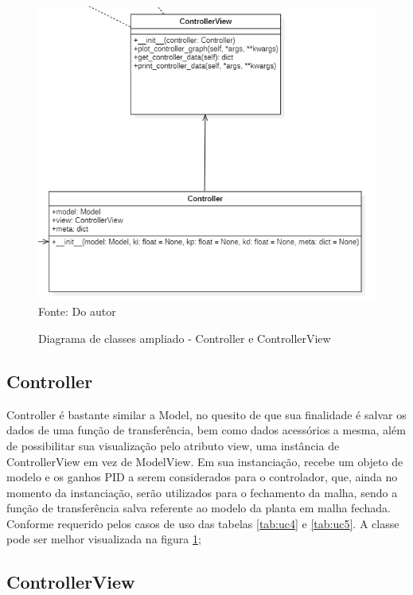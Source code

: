 \begin{figure}[H]
    \centering
    \caption{Diagrama de classes ampliado - Controller e ControllerView}
    \includegraphics[scale=0.7]{figuras/class_diag_controller}
    \label{fig:class_diag_controller}
    \\
    \vspace{0cm}\hspace{0cm}\small{Fonte: Do autor}
\end{figure}

\subsection{Controller}

Controller é bastante similar a Model, no quesito de que sua finalidade é salvar os dados de uma função de
transferência, bem como dados acessórios a mesma, além de possibilitar sua visualização pelo atributo view, uma
instância de ControllerView em vez de ModelView.
Em sua instanciação, recebe um objeto de modelo e os ganhos PID a serem considerados para o controlador, que, ainda no
momento da instanciação, serão utilizados para o fechamento da malha, sendo a função de transferência salva referente
ao modelo da planta em malha fechada.
Conforme requerido pelos casos de uso das tabelas \ref{tab:uc4} e \ref{tab:uc5}.
A classe pode ser melhor visualizada na figura \ref{fig:class_diag_controller};

\subsection{ControllerView}


